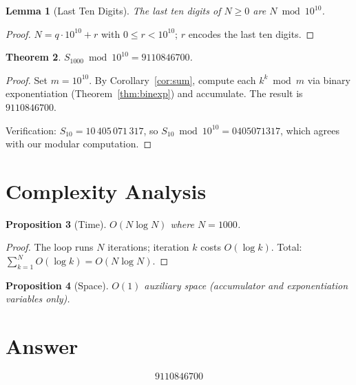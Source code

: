 \documentclass[12pt]{article}
\newtheorem{theorem}{Theorem}
\newtheorem{lemma}[theorem]{Lemma}
\newtheorem{proposition}[theorem]{Proposition}
\begin{document}
\begin{lemma}[Last Ten Digits]\label{lem:digits}
The last ten digits of $N \geq 0$ are $N \bmod 10^{10}$.
\end{lemma}

\begin{proof}
$N = q \cdot 10^{10} + r$ with $0 \leq r < 10^{10}$; $r$ encodes the last ten digits.
\end{proof}

\begin{theorem}\label{thm:answer}
$S_{1000} \bmod 10^{10} = 9110846700$.
\end{theorem}

\begin{proof}
Set $m = 10^{10}$. By Corollary~\ref{cor:sum}, compute each $k^k \bmod m$ via binary exponentiation (Theorem~\ref{thm:binexp}) and accumulate. The result is $9110846700$.

Verification: $S_{10} = 10\,405\,071\,317$, so $S_{10} \bmod 10^{10} = 0405071317$, which agrees with our modular computation.
\end{proof}

\section{Complexity Analysis}

\begin{proposition}[Time]
$O(N \log N)$ where $N = 1000$.
\end{proposition}

\begin{proof}
The loop runs $N$ iterations; iteration $k$ costs $O(\log k)$. Total: $\sum_{k=1}^{N} O(\log k) = O(N \log N)$.
\end{proof}

\begin{proposition}[Space]
$O(1)$ auxiliary space (accumulator and exponentiation variables only).
\end{proposition}

\section{Answer}

\[
\boxed{9110846700}
\]
\end{document}
